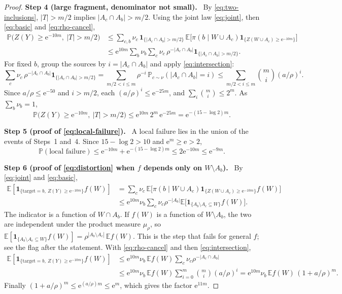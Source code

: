 \documentclass[11pt]{article}
\numberwithin{equation}{section}
\theoremstyle{remark}
\newcommand{\PP}{\mathbb P}
\newcommand{\EE}{\mathbb E}
\newcommand{\ind}{\mathbf 1}
\newcommand{\ee}{\mathrm e}
\newcommand{\step}[1]{\par\medskip\noindent\textbf{#1}\ }
\begin{document}
\begin{proof}
\step{Step 4 (large fragment, denominator not small).} By
\eqref{eq:two-inclusions}, $|T|>m/2$ implies $|A_c\cap A_b|>m/2$. Using
the joint law \eqref{eq:joint}, then \eqref{eq:basic} and
\eqref{eq:rho-cancel},
\begin{align*}
 \PP\bigl(Z(Y)\ge\ee^{-10m},\ |T|>m/2\bigr)
 &\le\sum_{c,b}\nu_c\,\ind_{\{|A_c\cap A_b|>m/2\}}\,
   \EE\bigl[\pi(b\mid W\cup A_c)\ind_{\{Z(W\cup A_c)\ge\ee^{-10m}\}}\bigr]\\
 &\le\ee^{10m}\sum_{b}\nu_b\sum_{c}\nu_c\,
   \rho^{-|A_c\cap A_b|}\ind_{\{|A_c\cap A_b|>m/2\}}.
\end{align*}
For fixed $b$, group the sources by $i=|A_c\cap A_b|$ and apply
\eqref{eq:intersection}:
\[
 \sum_{c}\nu_c\,\rho^{-|A_c\cap A_b|}\ind_{\{|A_c\cap A_b|>m/2\}}
 =\sum_{m/2<i\le m}\rho^{-i}\,\PP_{c\sim\nu}(|A_c\cap A_b|=i)
 \le\sum_{m/2<i\le m}\binom mi(a/\rho)^i .
\]
Since $a/\rho\le\ee^{-50}$ and $i>m/2$, each $(a/\rho)^i\le\ee^{-25m}$,
and $\sum_i\binom mi\le2^m$. As $\sum_b\nu_b=1$,
\[
 \PP\bigl(Z(Y)\ge\ee^{-10m},\ |T|>m/2\bigr)
 \le\ee^{10m}\,2^m\,\ee^{-25m}=\ee^{-(15-\log2)m}.
\]

\step{Step 5 (proof of \eqref{eq:local-failure}).} A local failure lies
in the union of the events of Steps~1 and~4. Since $15-\log2>10$ and
$\ee^m\ge\ee>2$,
\[
 \PP(\text{local failure})
 \le\ee^{-10m}+\ee^{-(15-\log 2)m}
 \le2\ee^{-10m}\le\ee^{-9m}.
\]

\step{Step 6 (proof of \eqref{eq:distortion} when $f$ depends only on
$W\setminus A_b$).} By \eqref{eq:joint} and \eqref{eq:basic},
\begin{align*}
 \EE\!\left[
 \ind_{\{\mathrm{target}=b,\ Z(Y)\ge\ee^{-10m}\}} f(W)
 \right]
 &=\sum_c\nu_c\,\EE\bigl[\pi(b\mid W\cup A_c)
     \ind_{\{Z(W\cup A_c)\ge\ee^{-10m}\}}f(W)\bigr]\\
 &\le\ee^{10m}\nu_b\sum_c\nu_c\rho^{-|A_b|}
       \EE\bigl[\ind_{\{A_b\setminus A_c\subseteq W\}}f(W)\bigr].
\end{align*}
The indicator is a function of $W\cap A_b$. If $f(W)$ is a function of
$W\setminus A_b$, the two are independent under the product measure
$\mu_\rho$, so
$\EE[\ind_{\{A_b\setminus A_c\subseteq W\}}f(W)]
 =\rho^{|A_b\setminus A_c|}\,\EE f(W)$.
This is the step that fails for general $f$; see the flag after the
statement. With \eqref{eq:rho-cancel} and then \eqref{eq:intersection},
\begin{align*}
 \EE\!\left[
 \ind_{\{\mathrm{target}=b,\ Z(Y)\ge\ee^{-10m}\}} f(W)
 \right]
 &\le\ee^{10m}\nu_b\,\EE f(W)\sum_c\nu_c\rho^{-|A_c\cap A_b|}\\
 &\le\ee^{10m}\nu_b\,\EE f(W)\sum_{i=0}^m\binom mi(a/\rho)^i
 =\ee^{10m}\nu_b\,\EE f(W)\,(1+a/\rho)^m .
\end{align*}
Finally $(1+a/\rho)^m\le\ee^{(a/\rho)m}\le\ee^m$, which gives the factor
$\ee^{11m}$.
\end{proof}
\end{document}
